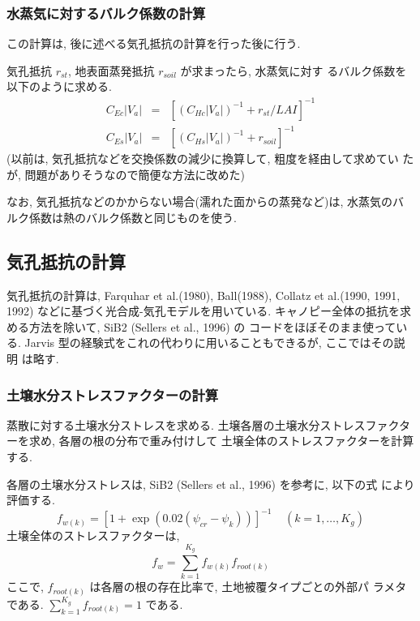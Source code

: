 \subsubsection{水蒸気に対するバルク係数の計算}

この計算は, 後に述べる気孔抵抗の計算を行った後に行う.

気孔抵抗 $r_{st}$, 地表面蒸発抵抗 $r_{soil}$ が求まったら, 水蒸気に対す
るバルク係数を以下のように求める.
\begin{eqnarray}
 C_{Ec} |V_a| &=& \left[ (C_{Hc} |V_a|)^{-1} + r_{st} / LAI\right]^{-1} \\
 C_{Es} |V_a| &=& \left[ (C_{Hs} |V_a|)^{-1} + r_{soil}\right]^{-1}
\end{eqnarray}
(以前は, 気孔抵抗などを交換係数の減少に換算して, 粗度を経由して求めてい
たが, 問題がありそうなので簡便な方法に改めた)

なお, 気孔抵抗などのかからない場合(濡れた面からの蒸発など)は, 水蒸気のバ
ルク係数は熱のバルク係数と同じものを使う.

\subsection{気孔抵抗の計算}

気孔抵抗の計算は, Farquhar et al.(1980), Ball(1988), Collatz et
al.(1990, 1991, 1992) などに基づく光合成-気孔モデルを用いている.
キャノピー全体の抵抗を求める方法を除いて, SiB2 (Sellers et al., 1996) の
コードをほぼそのまま使っている.
Jarvis 型の経験式をこれの代わりに用いることもできるが, ここではその説明
は略す.

\subsubsection{土壌水分ストレスファクターの計算}

蒸散に対する土壌水分ストレスを求める.
土壌各層の土壌水分ストレスファクターを求め, 各層の根の分布で重み付けして
土壌全体のストレスファクターを計算する.

各層の土壌水分ストレスは, SiB2 (Sellers et al., 1996) を参考に, 以下の式
により評価する.
\begin{equation}
 f_{w(k)} = [ 1 + \exp( 0.02 (\psi_{cr} - \psi_{k}) ) ]^{-1}
\ \ \ \ \ (k=1,\ldots,K_g)
\end{equation}
土壌全体のストレスファクターは,
\begin{equation}
 f_w = \sum_{k=1}^{K_g} f_{w(k)} f_{root(k)}
\end{equation}
ここで, $f_{root(k)}$ は各層の根の存在比率で, 土地被覆タイプごとの外部パ
ラメタである. $\sum_{k=1}^{K_g} f_{root(k)}=1$ である.

